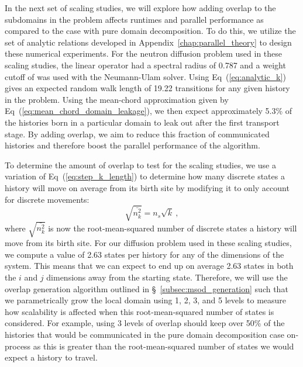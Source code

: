In the next set of scaling studies, we will explore how adding overlap
to the subdomains in the problem affects runtimes and parallel
performance as compared to the case with pure domain decomposition. To
do this, we utilize the set of analytic relations developed in
Appendix~\ref{chap:parallel_theory} to design these numerical
experiments. For the neutron diffusion problem used in these scaling
studies, the linear operator had a spectral radius of 0.787 and a
weight cutoff of  was used with the Neumann-Ulam
solver. Using Eq~(\ref{eq:analytic_k}) gives an expected random walk
length of 19.22 transitions for any given history in the
problem. Using the mean-chord approximation given by
Eq~(\ref{eq:mean_chord_domain_leakage}), we then expect approximately
5.3\% of the histories born in a particular domain to leak out after
the first transport stage. By adding overlap, we aim to reduce this
fraction of communicated histories and therefore boost the parallel
performance of the algorithm.

To determine the amount of overlap to test for the scaling studies, we
use a variation of Eq~(\ref{eq:step_k_length}) to determine how many
discrete states a history will move on average from its birth site by
modifying it to only account for discrete movements:
\begin{equation}
  \sqrt{\bar{n^2_k}} = n_s \sqrt{k}\:,
  \label{eq:discrete_distance}
\end{equation}
where $\sqrt{\bar{n^2_k}}$ is now the root-mean-squared number of
discrete states a history will move from its birth site. For our
diffusion problem used in these scaling studies, we compute a value of
2.63 states per history for any of the dimensions of the system. This
means that we can expect to end up on average 2.63 states in both the
$i$ and $j$ dimensions away from the starting state. Therefore, we
will use the overlap generation algorithm outlined in
\S~\ref{subsec:msod_generation} such that we parametrically grow the
local domain using 1, 2, 3, and 5 levels to measure how scalability is
affected when this root-mean-squared number of states is
considered. For example, using 3 levels of overlap should keep over
50\% of the histories that would be communicated in the pure domain
decomposition case on-process as this is greater than the
root-mean-squared number of states we would expect a history to
travel.


